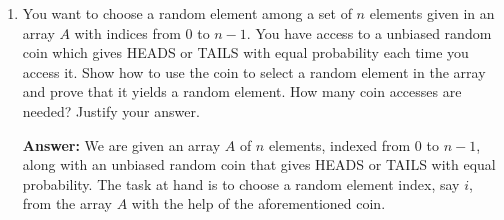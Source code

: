 \documentclass[11pt]{article}
\begin{document}
\begin{enumerate}
\item You want to choose a random element among a set of $n$  elements given in an array $A$ with indices from 
0 to $n-1$. You have access to a unbiased random coin which gives HEADS or TAILS with equal probability each time you access it. Show how to use the coin
to select a random element in the array and prove that it yields a random element. How many coin accesses are needed? Justify your answer.











    \textbf{Answer:}
    We are given an array \(A\) of \(n\) elements, indexed from \(0\) to \(n - 1\), along with an unbiased random coin that gives HEADS or TAILS with equal probability. The task at hand is to choose a random element index, say \(i\), from the array \(A\) with the help of the aforementioned coin.


\end{enumerate}
\end{document}
